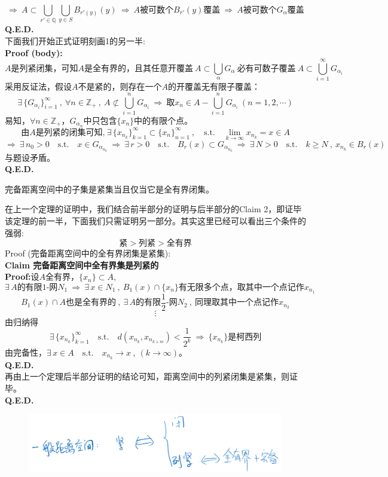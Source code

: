 \[\Rightarrow \ A \subset \bigcup_{r' \in \mathbb{Q}}\bigcup_{y \in S}B_{r'(y)}(y) \ \Rightarrow \ A\text{被可数个}B_{r'}(y)\text{覆盖} \ \Rightarrow \ A\text{被可数个}G_{\alpha}\text{覆盖}\]
\textbf{Q.E.D.}\\
下面我们开始正式证明刻画1的另一半:\\
\textbf{Proof (body):}
\[A\text{是列紧闭集，可知}A\text{是全有界的，且其任意开覆盖} \ A \subset \bigcup_{\alpha}G_{\alpha} \ \text{必有可数子覆盖} \ A \subset \bigcup_{i=1}^{\infty}G_{\alpha_i}\]
采用反证法，假设$A$不是紧的，则存在一个$A$的开覆盖无有限子覆盖：
\[\exists \, \{G_{\alpha_i}\}_{i=1}^{\infty} \ , \ \forall n \in \mathbb{Z}_+ \ , \ A \nsubset \bigcup_{i=1}^nG_{\alpha_i} \ \Rightarrow \ \text{取}x_n \in A-\bigcup_{i=1}^nG_{\alpha_i} \ (n=1,2,\cdots)\]
易知，$\forall n \in \mathbb{Z}_+$，$G_{\alpha_n}$中只包含$\{x_n\}$中的有限个点。\\
\[\text{由}A\text{是列紧的闭集可知,} \ \exists \, \{x_{n_k}\}_{k=1}^{\infty} \subset \{x_n\}_{n=1}^{\infty} \ , \quad \text{s.t.} \quad \lim_{k \to \infty}x_{n_k}=x \in A\]
\[\Rightarrow \ \exists \, n_0>0 \quad \text{s.t.} \quad x \in G_{\alpha_{n_0}} \ \Rightarrow \ \exists \, r>0 \quad \text{s.t.} \quad B_r(x) \subset G_{\alpha_{n_0}} \ \Rightarrow \ \exists \, N>0 \quad \text{s.t.} \quad k \geq N \ , \ x_{n_k} \in B_r(x)\]
与题设矛盾。\\
\textbf{Q.E.D.}
\begin{theorem}
    完备距离空间中的子集是紧集当且仅当它是全有界闭集。
\end{theorem}
在上一个定理的证明中，我们结合前半部分的证明与后半部分的Claim 2，即证毕该定理的前一半，下面我们只需证明另一部分。其实这里已经可以看出三个条件的强弱:
\[\text{紧}>\text{列紧}>\text{全有界}\]
Proof (完备距离空间中的全有界闭集是紧集):\\
\textbf{Claim 完备距离空间中全有界集是列紧的}\\
\textbf{Proof:}设$A$全有界，$\{x_n\} \subset A$,
\[\exists \, A\text{的有限}1\text{-网}N_1 \ \Rightarrow \ \exists \, x \in N_1 \ , \ B_1(x) \cap \{x_n\}\text{有无限多个点，取其中一个点记作}x_{n_1}\]
\[B_1(x) \cap A\text{也是全有界的} \ , \ \exists \, A\text{的有限}\frac{1}{2}\text{-网}N_2 \ , \ \text{同理取其中一个点记作}x_{n_2}\]
\[\vdots\]
由归纳得
\[\exists \, \{x_{n_k}\}_{k=1}^{\infty} \quad \text{s.t.} \quad d(x_{n_k},x_{n_{k+m}})<\frac{1}{2^k} \ \Rightarrow \ \{x_{n_k}\}\text{是柯西列}\]
由完备性，$\exists \, x \in A \quad \text{s.t.} \quad x_{n_k} \to x \ , \ (k \to \infty)$。\\
\textbf{Q.E.D.}\\
再由上一个定理后半部分证明的结论可知，距离空间中的列紧闭集是紧集，则证毕。\\
\textbf{Q.E.D.}
\begin{figure}[htbp]
    \center
    \includegraphics[scale=0.25]{./fig/2.2.3-1.png}
\end{figure}

